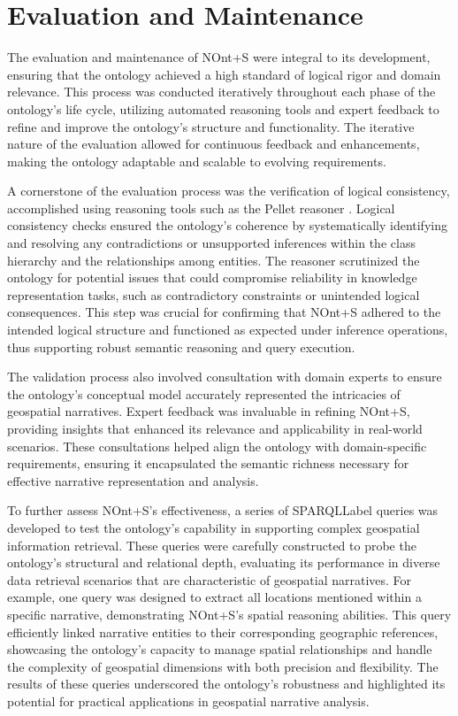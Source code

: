 \section{Evaluation and Maintenance}\label{IV-sec:evaluation-maintenance}

The evaluation and maintenance of NOnt+S were integral to its development, ensuring that the ontology achieved a high standard of logical rigor and domain relevance. This process was conducted iteratively throughout each phase of the ontology's life cycle, utilizing automated reasoning tools and expert feedback to refine and improve the ontology's structure and functionality. The iterative nature of the evaluation allowed for continuous feedback and enhancements, making the ontology adaptable and scalable to evolving requirements.

A cornerstone of the evaluation process was the verification of logical consistency, accomplished using reasoning tools such as the Pellet reasoner \cite{sirinPelletPracticalOWLDL2007}. Logical consistency checks ensured the ontology's coherence by systematically identifying and resolving any contradictions or unsupported inferences within the class hierarchy and the relationships among entities. The reasoner scrutinized the ontology for potential issues that could compromise reliability in knowledge representation tasks, such as contradictory constraints or unintended logical consequences. This step was crucial for confirming that NOnt+S adhered to the intended logical structure and functioned as expected under inference operations, thus supporting robust semantic reasoning and query execution.

The validation process also involved consultation with domain experts to ensure the ontology's conceptual model accurately represented the intricacies of geospatial narratives. Expert feedback was invaluable in refining NOnt+S, providing insights that enhanced its relevance and applicability in real-world scenarios. These consultations helped align the ontology with domain-specific requirements, ensuring it encapsulated the semantic richness necessary for effective narrative representation and analysis.

To further assess NOnt+S’s effectiveness, a series of \acrshort{SPARQLLabel} queries was developed to test the ontology's capability in supporting complex geospatial information retrieval. These queries were carefully constructed to probe the ontology's structural and relational depth, evaluating its performance in diverse data retrieval scenarios that are characteristic of geospatial narratives. For example, one query was designed to extract all locations mentioned within a specific narrative, demonstrating NOnt+S’s spatial reasoning abilities. This query efficiently linked narrative entities to their corresponding geographic references, showcasing the ontology’s capacity to manage spatial relationships and handle the complexity of geospatial dimensions with both precision and flexibility. The results of these queries underscored the ontology’s robustness and highlighted its potential for practical applications in geospatial narrative analysis.

